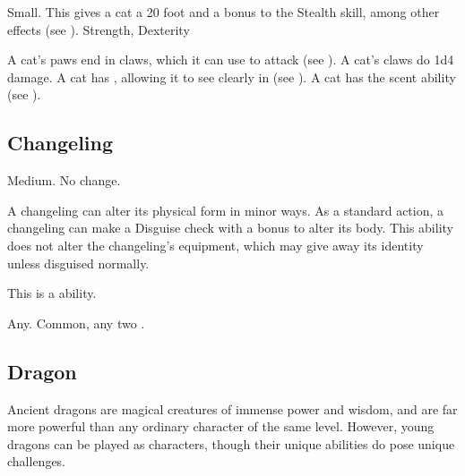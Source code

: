 
             Small. This gives a cat a 20 foot  and a  bonus to the Stealth skill, among other effects (see ).
              Strength,  Dexterity
            \begin{itemize}
                 A cat's paws end in claws, which it can use to attack (see ). A cat's claws do 1d4 damage.
                 A cat has , allowing it to see clearly in  (see ).
                 A cat has the scent ability (see ).
            \end{itemize}

    \subsection{Changeling}

         Medium.
         No change.
        \begin{itemize}
             A changeling can alter its physical form in minor ways. As a standard action, a changeling can make a Disguise check with a  bonus to alter its body. This ability does not alter the changeling's equipment, which may give away its identity unless disguised normally.

            This is a  ability.
        \end{itemize}
         Any.
         Common, any two .

    \subsection{Dragon}
        Ancient dragons are magical creatures of immense power and wisdom, and are far more powerful than any ordinary character of the same level.
        However, young dragons can be played as characters, though their unique abilities do pose unique challenges.

